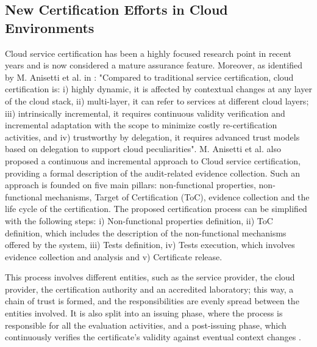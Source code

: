 

\subsection{New Certification Efforts in Cloud Environments}
Cloud service certification has been a highly focused research point in recent years and is now considered a mature assurance feature. Moreover, as identified by M. Anisetti et al. in \cite{anisetti2017semi}: "Compared to traditional service certification, cloud certification is: i) highly dynamic, it is affected by contextual changes at any layer of the cloud stack, ii) multi-layer, it can refer to services at different cloud layers; iii) intrinsically incremental, it requires continuous validity verification and incremental adaptation with the scope to minimize costly re-certification activities, and iv) trustworthy by delegation, it requires advanced trust models based on delegation to support cloud peculiarities". M. Anisetti et al. also proposed a continuous and incremental approach to Cloud service certification, providing a formal description of the audit-related evidence collection. Such an approach is founded on five main pillars: non-functional properties, non-functional mechanisms, Target of Certification (ToC), evidence collection and the life cycle of the certification. The proposed certification process can be simplified with the following steps: i) Non-functional properties definition, ii) ToC definition, which includes the description of the non-functional mechanisms offered by the system, iii) Tests definition, iv) Tests execution, which involves evidence collection and analysis and v) Certificate release.


This process involves different entities, such as the service provider, the cloud provider, the certification authority and an accredited laboratory; this way, a chain of trust is formed, and the responsibilities are evenly spread between the entities involved. It is also split into an issuing phase, where the process is responsible for all the evaluation activities, and a post-issuing phase, which continuously verifies the certificate's validity against eventual context changes \cite{anisetti2017semi}.

